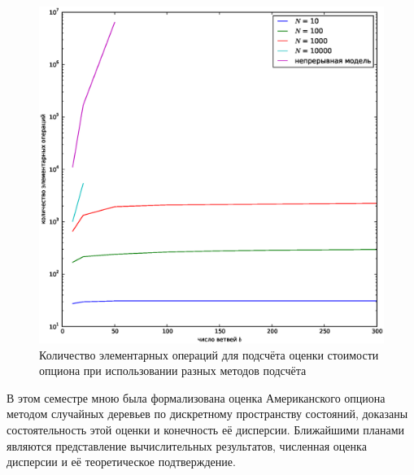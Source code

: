 \documentclass[specialist,
               substylefile = ../spbu.rtx,
               subf,href,colorlinks=true, 12pt]{disser}
\begin{document}
    \begin{figure}[h]
    		\includegraphics[width=\textwidth]{complexity_130}
    		\caption{Количество элементарных операций для подсчёта оценки стоимости опциона при использовании разных методов подсчёта}
    		\label{fig:complexity}
	\end{figure}

\conclusion
    В этом семестре мною была формализована оценка Американского опциона методом случайных деревьев по дискретному пространству состояний, доказаны состоятельность этой оценки и конечность её дисперсии. Ближайшими планами являются представление вычислительных результатов, численная оценка дисперсии и её теоретическое подтверждение.
    



\end{document}
